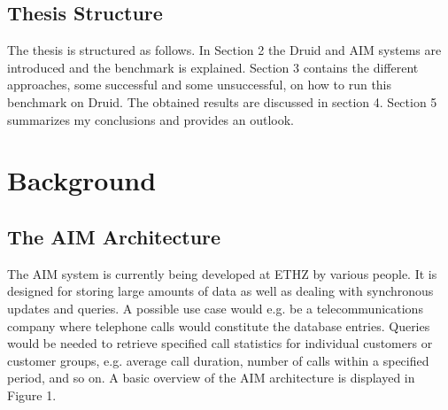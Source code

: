 \documentclass[11pt,singlecolumn]{scrartcl}
\begin{document}
\subsection{Thesis Structure}
The thesis is structured as follows. In Section 2 the Druid and AIM systems are introduced and the benchmark is explained. Section 3 contains the different approaches, some successful and some unsuccessful, on how to run this benchmark on Druid. The obtained results are discussed in section 4. Section 5 summarizes my conclusions and provides an outlook.
\clearpage

\section{Background}
\subsection{The AIM Architecture}
The AIM system \cite{aim} is currently being developed at ETHZ by various people. It is designed for storing large amounts of data as well as dealing with synchronous updates and queries. A possible use case would e.g. be a telecommunications company where telephone calls would constitute the database entries. Queries would be needed to retrieve specified call statistics for individual customers or customer groups, e.g. average call duration, number of calls within a specified period, and so on. A basic overview of the AIM architecture is displayed in Figure 1.\\\\
\end{document}
